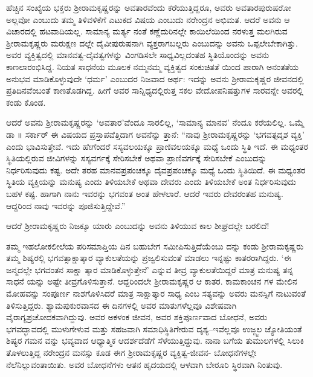 ಹೆಚ್ಚಿನ ಸಂಖ್ಯೆಯ ಭಕ್ತರು ಶ್ರೀರಾಮಕೃಷ್ಣರನ್ನು ಅವತಾರವೆಂದು ಕರೆಯುತ್ತಿದ್ದರೂ, ಅವರು ಅವತಾರಪುರುಷರೋ ಅಲ್ಲವೋ ಎಂಬುದು ತಮ್ಮ ತಿಳಿವಳಿಕೆಗೆ ಎಟುಕದ ವಿಷಯ ಎಂಬುದು ನರೇಂದ್ರನ ಅಭಿಮತ. ಆದರೆ ಅವನು ಆ ವಿಚಾರದಲ್ಲಿ ಹಟವಾದಿಯಲ್ಲ. ಸಾಮಾನ್ಯ ಮರ್ತ್ಯ ನಂತೆ ಕಣ್ಣೆದುರಿನಲ್ಲೇ ಕಾಯಿಲೆಯಿಂದ ನರಳುತ್ತ ಮಲಗಿರುವ ಶ್ರೀರಾಮಕೃಷ್ಣರು ಮರುಕ್ಷಣ ದಲ್ಲೇ ದೈವೀಪುರುಷನಾಗಿ ವ್ಯಕ್ತರಾಗಬಲ್ಲರು ಎಂಬುದನ್ನು ಅವನು ಒಪ್ಪಲೇಬೇಕಾಗಿತ್ತು. ಅವರ ವ್ಯಕ್ತಿತ್ವದಲ್ಲಿ ಮಾನವತ್ವ-ದೈವತ್ವಗಳನ್ನು ವಿಂಗಡಿಸಲೇ ಸಾಧ್ಯವಿಲ್ಲದಂತಹ ಸ್ಥಿತಿಯೊಂದನ್ನು ಅವನು ಕಾಣಲಾರಂಭಿಸಿದ್ದ. ನಿಯತ ಸಾಧನೆಯ ಮೂಲಕ ನಮ್ಮನಮ್ಮ ವ್ಯಕ್ತಿತ್ವದ ಸಂಕುಚಿತತೆ ಯಿಂದ ಪಾರಾಗಿ ಅನಂತತೆಯ ಅನುಭವ ಮಾಡಿಕೊಳ್ಳುವುದೇ ‘ಧರ್ಮ’ ಎಂಬುದರ ನಿಜವಾದ ಅರ್ಥ: ಇದನ್ನು ಅವನು ಶ್ರೀರಾಮಕೃಷ್ಣರ ಜೀವನದಲ್ಲಿ ಪ್ರತಿದಿನವೆಂಬಂತೆ ಕಾಣತೊಡಗಿದ್ದ. ಹೀಗೆ ಅವರ ಸಾನ್ನಿಧ್ಯದಲ್ಲಿರುತ್ತ ಸಕಲ ವೇದೋಪನಿಷತ್ತುಗಳ ಸಾರವನ್ನೇ ಅವರಲ್ಲಿ ಕಂಡು ಕೊಂಡ.

ಆದರೆ ಅವನು ಶ್ರೀರಾಮಕೃಷ್ಣರನ್ನು ‘ಅವತಾರ’ವೆಂದೂ ಸಾರಲಿಲ್ಲ, ‘ಸಾಮಾನ್ಯ ಮಾನವ’ ನೆಂದೂ ಕರೆಯಲಿಲ್ಲ. ಒಮ್ಮೆ ಡಾ ॥ ಸರ್ಕಾರ್ ಈ ವಿಷಯದ ಪ್ರಸ್ತಾಪವೆತ್ತಿದಾಗ ಅವನೆನ್ನು ತ್ತಾನೆ: “ನಾವು ಶ್ರೀರಾಮಕೃಷ್ಣರನ್ನು ‘ಭಗವತ್ಸದೃಶ ವ್ಯಕ್ತಿ’ ಎಂದು ಭಾವಿಸುತ್ತೇವೆ. ಇದು ಹೇಗೆಂದರೆ ಸಸ್ಯವಲಯಕ್ಕೂ ಪ್ರಾಣಿವಲಯಕ್ಕೂ ಮಧ್ಯೆ ಒಂದು ಸ್ಥಿತಿ ಇದೆ. ಈ ಮಧ್ಯಂತರ ಸ್ಥಿತಿಯಲ್ಲಿರುವ ಜೀವಿಗಳನ್ನು ಸಸ್ಯವರ್ಗಕ್ಕೆ ಸೇರಿಸಬೇಕೆ ಅಥವಾ ಪ್ರಾಣಿವರ್ಗಕ್ಕೆ ಸೇರಿಸಬೇಕೆ ಎಂಬುದನ್ನು ನಿರ್ಧರಿಸುವುದು ಕಷ್ಟ. ಅದೇ ತರಹ ಮಾನವಪ್ರಪಂಚಕ್ಕೂ ದೈವಪ್ರಪಂಚಕ್ಕೂ ಮಧ್ಯೆ ಒಂದು ಸ್ಥಿತಿಯಿದೆ. ಈ ಮಧ್ಯಂತರ ಸ್ಥಿತಿಯ ವ್ಯಕ್ತಿಯನ್ನು ಮನುಷ್ಯ ಎಂದು ತಿಳಿಯಬೇಕೆ ಅಥವಾ ದೇವರು ಎಂದು ತಿಳಿಯಬೇಕೆ ಅಂತ ನಿರ್ಧರಿಸುವುದು ಬಹಳ ಕಷ್ಟ. ಹಾಗಾಗಿ ನಾನು ಇವರನ್ನು ಭಗವಂತ ಅಂತ ಹೇಳಲಾರೆ. ಆದರೆ ಇವರು ದೇವರಂತಹ ಮನುಷ್ಯ. ಆದ್ದರಿಂದ ನಾವು ಇವರನ್ನು ಪೂಜಿಸುತ್ತಿದ್ದೇವೆ.”

ಆದರೆ ಶ್ರೀರಾಮಕೃಷ್ಣರು ನಿಜಕ್ಕೂ ಯಾರು ಎಂಬುದನ್ನು ಅವನು ತಿಳಿಯುವ ಕಾಲ ಶೀಘ್ರದಲ್ಲೇ ಬರಲಿದೆ!

ತಮ್ಮ ಇಹಲೋಕಲೀಲೆಯ ಪರಿಸಮಾಪ್ತಿಯ ದಿನ ಬಹುಬೇಗ ಸಮೀಪಿಸುತ್ತಿದೆಯೆಂಬು ದನ್ನು ಕಂಡು ಶ್ರೀರಾಮಕೃಷ್ಣರು ತಮ್ಮ ಶಿಷ್ಯರಲ್ಲಿ ಭಗವತ್ಸಾಕ್ಷಾತ್ಕಾರ ವ್ಯಾಕುಲತೆಯನ್ನು ಪ್ರಜ್ವಲಿಸುವಂತೆ ಮಾಡಲು ಇನ್ನಷ್ಟು ಕಾತರರಾಗಿದ್ದರು. ‘ಈ ಜನ್ಮದಲ್ಲೇ ಭಗವಂತನ ಸಾಕ್ಷಾ ತ್ಕಾರ ಮಾಡಿಕೊಳ್ಳುತ್ತೇನೆ’ ಎನ್ನುವ ತೀವ್ರ ವ್ಯಾಕುಲತೆಯಿದ್ದರೆ ಮಾತ್ರ ಮನುಷ್ಯ ತನ್ನ ಸಾಧನೆ ಯನ್ನು ಅಷ್ಟೇ ತೀವ್ರಗೊಳಿಸುತ್ತಾನೆ. ಆದ್ದರಿಂದಲೇ ಶ್ರೀರಾಮಕೃಷ್ಣರ ಆ ಕಾತರ. ಕಾಮಕಾಂಚನ ಗಳ ಮೇಲಿನ ಮೋಹವನ್ನು ಸಂಪೂರ್ಣ ನಾಶಗೊಳಿಸಿದರೆ ಮಾತ್ರ ಸಾಕ್ಷಾತ್ಕಾರ ಸಾಧ್ಯ ಎಂಬ ಸತ್ಯವನ್ನು ಅವರು ಮನಸ್ಸಿಗೆ ನಾಟುವಂತೆ ತಿಳಿಸುತ್ತಿದ್ದರು. ಶ್ಯಾಮಪುಕುರವಾಸದ ಈ ದಿನಗಳಲ್ಲಿ ಅವರ ಮಾತುಗಳೆಲ್ಲವೂ ವಿಶೇಷವಾಗಿ ವೈರಾಗ್ಯಪ್ರಚೋದಕವಾಗಿದ್ದುವು. ಅವರ ಅಕಳಂಕ ಜೀವನ, ಅವರ ಶಕ್ತಿಪೂರ್ಣವಾದ ಬೋಧನೆ, ಅವರು ಭಗವದ್ಭಾವದಲ್ಲಿ ಮುಳುಗೇಳುವ ಮತ್ತು ಸಹಜವಾಗಿ ಸಮಾಧಿಸ್ಥಿತಿಗೇರುವ ದೃಶ್ಯ–ಇವೆಲ್ಲವೂ ಉಜ್ಜ್ವಲ ಜ್ಯೋತಿಯಂತೆ ಶಿಷ್ಯರ ಗಮನ ವನ್ನು ಭವ್ಯವಾದ ಆಧ್ಯಾತ್ಮಿಕ ಆದರ್ಶದೆಡೆಗೆ ಸೆಳೆಯುತ್ತಿದ್ದುವು. ನಾನಾ ಬಗೆಯ ತುಮುಲಗಳಲ್ಲಿ ಸಿಲುಕಿ ತೊಳಲುತ್ತಿದ್ದ ನರೇಂದ್ರನ ಮನಸ್ಸು ಕೂಡ ಈಗ ಶ್ರೀರಾಮಕೃಷ್ಣರ ವ್ಯಕ್ತಿತ್ವ-ಜೀವನ- ಬೋಧನೆಗಳಲ್ಲೇ ನೆಲೆನಿಲ್ಲುವಂತಾಯಿತು. ಅವರ ಬೋಧನೆಗಳು ಆತನ ಹೃದಯದಲ್ಲಿ ಆಳವಾಗಿ ಬೇರೂರಿ ಸ್ಥಿರವಾಗಿ ನಿಂತುವು.

